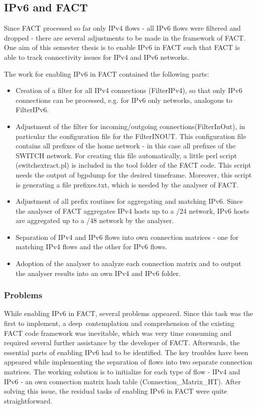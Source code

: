 \subsection{IPv6 and FACT}
Since FACT processed so far only IPv4 flows - all IPv6 flows were filtered and dropped - there are several adjustments to be made in the framework of FACT. One aim of this semester thesis is to enable IPv6 in FACT such that FACT is able to track connectivity issues for IPv4 and IPv6 networks.

The work for enabling IPv6 in FACT contained the following parts:

\begin{itemize}
	\item Creation of a filter for all IPv4 connections (FilterIPv4), so that only IPv6 connections can be processed, e.g. for IPv6
	 only networks, analogous to FilterIPv6.
	\item Adjustment of the filter for incoming/outgoing connections(FilterInOut), in particular the configuration file for the FilterINOUT. This configuration file contains all prefixes of the home network - in this case all prefixes of the SWITCH network. For creating this file automatically, a little perl script (switchextract.pl) is included in the tool folder of the FACT code. This script needs the output of bgpdump for the desired timeframe. Moreover, this script is generating a file prefixes.txt, which is needed by the analyser of FACT.
	\item Adjustment of all prefix routines for aggregating and matching IPv6. Since the analyser of FACT aggregates IPv4 hosts up to a /24 network, IPv6 hosts are aggregated up to a /48 network by the analyser.
	\item Separation of IPv4 and IPv6 flows into own connection matrices - one for matching IPv4 flows and the other for IPv6 flows.
	\item Adoption of the analyser to analyze each connection matrix and to output the analyser results into an own IPv4 and IPv6 folder.
\end{itemize}

\subsubsection{Problems}

While enabling IPv6 in FACT, several problems appeared. Since this task was the first to implement, a deep contemplation and comprehension of the existing FACT code framework was inevitable, which was very time consuming and required several further assistance by the developer of FACT. Afterwards, the essential parts of enabling IPv6 had to be identified. The key troubles have been appeared while implementing the separation of flows into two separate connection matrices. The working solution is to initialize for each type of flow - IPv4 and IPv6 - an own connection matrix hash table (Connection\_Matrix\_HT). After solving this issue, the residual tasks of enabling IPv6 in FACT were quite straightforward.

